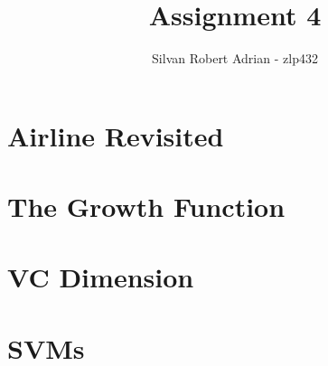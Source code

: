 \documentclass[a4paper]{article}
\title{\vspace{-5cm} Assignment 4}
\author{Silvan Robert Adrian - zlp432}
\begin{document}
\maketitle

\tableofcontents

\section{Airline Revisited}

\section{The Growth Function}


\section{VC Dimension}


\section{SVMs}

\end{document}

